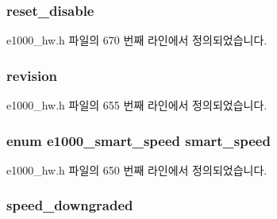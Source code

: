 \subsubsection[{\texorpdfstring{reset\+\_\+disable}{reset_disable}}]{ reset\+\_\+disable}\hypertarget{structe1000__phy__info_a66f1a4e3487cf19972c344ec3c269d14}{}\label{structe1000__phy__info_a66f1a4e3487cf19972c344ec3c269d14}


e1000\+\_\+hw.\+h 파일의 670 번째 라인에서 정의되었습니다.

\subsubsection[{\texorpdfstring{revision}{revision}}]{ revision}\hypertarget{structe1000__phy__info_ad09d98d987b5a93c1d0f0c57f53f1608}{}\label{structe1000__phy__info_ad09d98d987b5a93c1d0f0c57f53f1608}


e1000\+\_\+hw.\+h 파일의 655 번째 라인에서 정의되었습니다.

\subsubsection[{\texorpdfstring{smart\+\_\+speed}{smart_speed}}]{\setlength{\rightskip}{0pt plus 5cm}enum {\bf e1000\+\_\+smart\+\_\+speed} smart\+\_\+speed}\hypertarget{structe1000__phy__info_a3708e71dff26bfbdcdfa0ef3b5d2f869}{}\label{structe1000__phy__info_a3708e71dff26bfbdcdfa0ef3b5d2f869}


e1000\+\_\+hw.\+h 파일의 650 번째 라인에서 정의되었습니다.

\subsubsection[{\texorpdfstring{speed\+\_\+downgraded}{speed_downgraded}}]{ speed\+\_\+downgraded}\hypertarget{structe1000__phy__info_a5e4357dfafcd48b939df2512da585d78}{}\label{structe1000__phy__info_a5e4357dfafcd48b939df2512da585d78}


